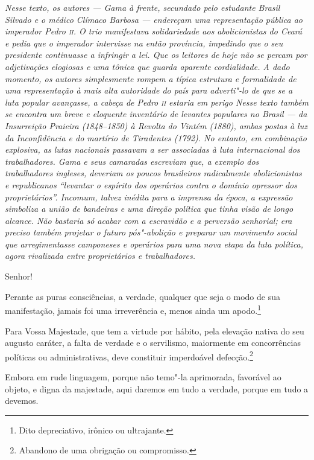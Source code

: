 \begin{flushleft}
{\footnotesize\itshape
Nesse texto, os autores --- Gama à frente, secundado pelo estudante
Brasil Silvado e o médico Clímaco Barbosa --- endereçam uma representação
pública ao imperador Pedro \textsc{ii}. O trio manifestava solidariedade aos
abolicionistas do Ceará e pedia que o imperador intervisse na então
província, impedindo que o seu presidente continuasse a infringir a lei.
Que os leitores de hoje não se
percam por adjetivações elogiosas e uma tônica que guarda aparente
cordialidade. A dado momento, os autores simplesmente rompem a típica
estrutura e formalidade de uma representação à mais alta autoridade do
país para adverti"-lo de que se a luta popular avançasse, a cabeça de
Pedro \textsc{ii} estaria em perigo
Nesse texto também se
encontra um breve e eloquente inventário de levantes populares no
Brasil --- da Insurreição Praieira (1848--1850) à Revolta do Vintém
(1880), ambas postas à luz da Inconfidência e do martírio de Tiradentes
(1792). No entanto, em combinação explosiva, as lutas nacionais passavam
a ser associadas à luta internacional dos trabalhadores.
Gama e seus camaradas escreviam que, a exemplo dos
trabalhadores ingleses, deveriam os poucos brasileiros radicalmente
abolicionistas e republicanos ``levantar o espírito dos operários contra
o domínio opressor dos proprietários''. Incomum, talvez inédita para a
imprensa da época, a expressão simboliza a união de bandeiras e uma
direção política que tinha visão de longo alcance. Não bastaria só
acabar com a escravidão e a perversão senhorial; era
preciso também projetar o futuro pós"-abolição e preparar um movimento
social que arregimentasse camponeses e operários para uma nova etapa da
luta política, agora rivalizada entre proprietários e trabalhadores. }
\end{flushleft}


\noindent{}Senhor!\smallskip

Perante as puras consciências, a verdade, qualquer que seja o modo de
sua manifestação, jamais foi uma irreverência e, menos ainda um
apodo.\footnote{Dito depreciativo, irônico ou ultrajante.}

Para Vossa Majestade, que tem a virtude por hábito, pela elevação nativa
do seu augusto caráter, a falta de verdade e o servilismo, maiormente em
concorrências políticas ou administrativas, deve constituir imperdoável
defecção.\footnote{Abandono de uma obrigação ou compromisso.}

Embora em rude linguagem, porque não temo"-la aprimorada, favorável ao
objeto, e digna da majestade, aqui daremos em tudo a verdade, porque em
tudo a devemos.

